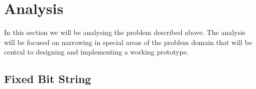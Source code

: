\documentclass[11pt]{article}
\begin{document}
\section{Analysis}
In this section we will be analysing the problem described above. The analysis will be focused on narrowing in special areas of the problem domain that will be central to designing and implementing a working prototype.
\subsection{Fixed Bit String}%
\end{document}
